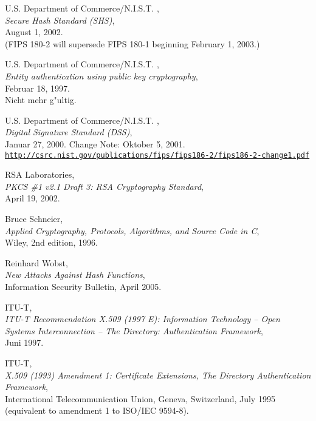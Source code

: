 \newpage
\begin{thebibliography}{99999}

 U.S. Department of Commerce/N.I.S.T. ,
     \\
    {\em Secure Hash Standard (SHS)}, \\
    August 1, 2002.\\
    (FIPS 180-2 will supersede FIPS 180-1 beginning February 1, 2003.)

 U.S. Department of Commerce/N.I.S.T. ,
     \\
    {\em Entity authentication using public key cryptography}, \\
    Februar 18, 1997.\\
    Nicht mehr g"ultig.

 U.S. Department of Commerce/N.I.S.T. ,
     \\
    {\em Digital Signature Standard (DSS)}, \\
    Januar 27, 2000. Change Note: Oktober 5, 2001.\\
  \href{http://csrc.nist.gov/publications/fips/fips186-2/fips186-2-change1.pdf}
   {\tt http://csrc.nist.gov/publications/fips/fips186-2/fips186-2-change1.pdf}

 RSA Laboratories,  
      \\
    {\em PKCS \#1 v2.1 Draft 3: RSA Cryptography Standard}, \\
    April 19, 2002.

  
    Bruce Schneier, \\
    {\em Applied Cryptography, Protocols, Algorithms, and Source Code in C}, \\
    Wiley, 2nd edition, 1996.

  
    Reinhard Wobst, \\
    {\em New Attacks Against Hash Functions}, \\
    Information Security Bulletin, April 2005.

 ITU-T,
     \\
    {\em ITU-T Recommendation X.509 (1997 E): Information Technology -- 
    Open Systems Interconnection -- The Directory: Authentication Framework},\\
    Juni 1997.

 ITU-T, 
       \\
    {\em X.509 (1993) Amendment 1: Certificate Extensions, The Directory
    Authentication Framework},\\ 
    International Telecommunication Union, Geneva, Switzerland, July 1995\\
    (equivalent to amendment 1 to ISO/IEC 9594-8).

\end{thebibliography}
                                                          


